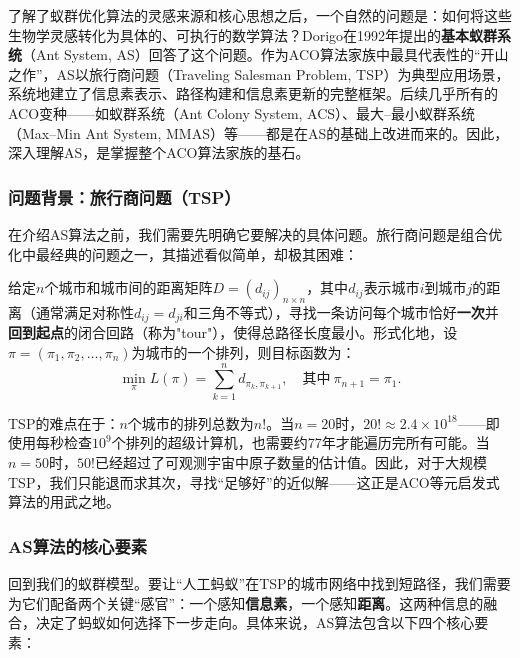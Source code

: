 \documentclass[lang=cn,zihao=-4,a4paper,fontset=windows]{beautybook}
\begin{document}
了解了蚁群优化算法的灵感来源和核心思想之后，一个自然的问题是：如何将这些生物学灵感转化为具体的、可执行的数学算法？Dorigo在1992年提出的\textbf{基本蚁群系统}（Ant System, AS）回答了这个问题。作为ACO算法家族中最具代表性的“开山之作”，AS以旅行商问题（Traveling Salesman Problem, TSP）为典型应用场景，系统地建立了信息素表示、路径构建和信息素更新的完整框架。后续几乎所有的ACO变种——如蚁群系统（Ant Colony System, ACS）、最大--最小蚁群系统（Max--Min Ant System, MMAS）等——都是在AS的基础上改进而来的。因此，深入理解AS，是掌握整个ACO算法家族的基石。

\subsubsection{问题背景：旅行商问题（TSP）}

在介绍AS算法之前，我们需要先明确它要解决的具体问题。旅行商问题是组合优化中最经典的问题之一，其描述看似简单，却极其困难：

\begin{definition}
给定$n$个城市和城市间的距离矩阵$D = (d_{ij})_{n \times n}$，其中$d_{ij}$表示城市$i$到城市$j$的距离（通常满足对称性$d_{ij} = d_{ji}$和三角不等式），寻找一条访问每个城市恰好\textbf{一次}并\textbf{回到起点}的闭合回路（称为"tour"），使得总路径长度最小。形式化地，设$\pi = (\pi_1, \pi_2, \dots, \pi_n)$为城市的一个排列，则目标函数为：
\[
\min_{\pi} L(\pi) = \sum_{k=1}^{n} d_{\pi_k, \pi_{k+1}}, \quad \text{其中}\ \pi_{n+1} = \pi_1.
\]
\end{definition}

TSP的难点在于：$n$个城市的排列总数为$n!$。当$n=20$时，$20! \approx 2.4\times10^{18}$——即使用每秒检查$10^9$个排列的超级计算机，也需要约77年才能遍历完所有可能。当$n=50$时，$50!$已经超过了可观测宇宙中原子数量的估计值。因此，对于大规模TSP，我们只能退而求其次，寻找“足够好”的近似解——这正是ACO等元启发式算法的用武之地。

\subsubsection{AS算法的核心要素}

回到我们的蚁群模型。要让“人工蚂蚁”在TSP的城市网络中找到短路径，我们需要为它们配备两个关键“感官”：一个感知\textbf{信息素}，一个感知\textbf{距离}。这两种信息的融合，决定了蚂蚁如何选择下一步走向。具体来说，AS算法包含以下四个核心要素：
\end{document}
